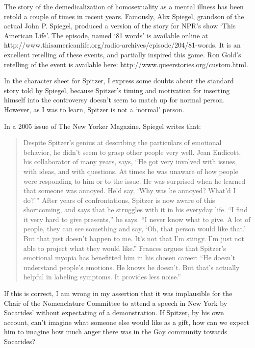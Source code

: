 \begin{refsection}
The story of the demedicalization of homosexuality as a mental illness has been retold a couple of times in recent years. Famously, Alix Spiegel, grandson of the actual John P. Spiegel, produced a version of the story for NPR's show `This American Life'. The episode, named `81 words' is available online at http:\slash \slash www.thisamericanlife.org\slash radio-archives\slash episode\slash 204\slash 81-words. It is an excellent retelling of these events, and partially inspired this game. Ron Gold's retelling of the event is available here: http:\slash \slash www.queerstories.org\slash custom.html.

In the character sheet for Spitzer, I express some doubts about the standard story told by Spiegel, because Spitzer's timing and motivation for inserting himself into the controversy doesn't seem to match up for normal person. However, as I was to learn, Spitzer is not a `normal' person.

In a 2005 issue of The New Yorker Magazine, Spiegel writes that:

\begin{quote}

Despite Spitzer’s genius at describing the particulars of emotional behavior, he didn’t seem to grasp other people very well. Jean Endicott, his collaborator of many years, says, “He got very involved with issues, with ideas, and with questions. At times he was unaware of how people were responding to him or to the issue. He was surprised when he learned that someone was annoyed. He’d say, ‘Why was he annoyed? What’d I do?’” After years of confrontations, Spitzer is now aware of this shortcoming, and says that he struggles with it in his everyday life. “I find it very hard to give presents,” he says. “I never know what to give. A lot of people, they can see something and say, ‘Oh, that person would like that.’ But that just doesn’t happen to me. It’s not that I’m stingy. I’m just not able to project what they would like.” Frances argues that Spitzer’s emotional myopia has benefitted him in his chosen career: “He doesn’t understand people’s emotions. He knows he doesn’t. But that’s actually helpful in labeling symptoms. It provides less noise.”
\end{quote}

If this is correct, I am wrong in my assertion that it was implausible for the Chair of the Nomenclature Committee to attend a speech in New York by Socarides' without expectating of a demonstration. If Spitzer, by his own account, can't imagine what someone else would like as a gift, how can we expect him to imagine how much anger there was in the Gay community towards Socarides?


\end{refsection}
